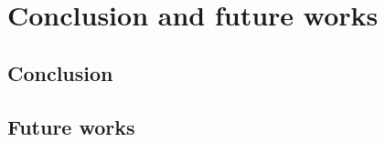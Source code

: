 \chapter{Conclusion and future works}\label{ch:conclusion}

\section{Conclusion}

\section{Future works}


\cleardoublepage

